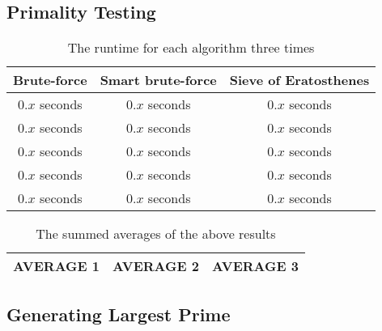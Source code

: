 \documentclass[main.tex]{subfiles}
\begin{document}
\subsection{Primality Testing}

\begin{table}[ht!]
    \centering
    \begin{tabular}{||c c c||} 
        \hline
        Brute-force & Smart brute-force & Sieve of Eratosthenes \\ [0.5ex] 
        \hline\hline
        $0.x$ seconds  & $0.x$ seconds & $0.x$ seconds  \\ 
        $0.x$ seconds & $0.x$ seconds & $0.x$ seconds  \\
        $0.x$ seconds & $0.x$ seconds & $0.x$ seconds  \\ 
        $0.x$ seconds & $0.x$ seconds & $0.x$ seconds  \\ 
        $0.x$ seconds & $0.x$ seconds & $0.x$ seconds  \\ [1ex] 
        \hline
    \end{tabular}
    \caption{The runtime for each algorithm three times}
\end{table}

\begin{table}[ht!]
    \centering
    \begin{tabular}{||c c c||} 
        \hline
        AVERAGE 1 & AVERAGE 2 & AVERAGE 3  \\ [0.5ex] 
        \hline
    \end{tabular}
    \caption{The summed averages of the above results}
\end{table}


\subsection{Generating Largest Prime}
\end{document}
